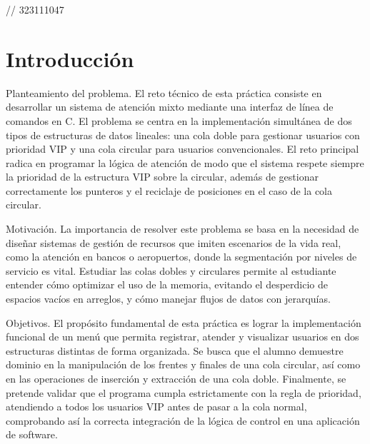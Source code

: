 // 323111047

\section{Introducción}

Planteamiento del problema. El reto técnico de esta práctica consiste en desarrollar un sistema de atención mixto mediante una interfaz de línea de comandos en C. El problema se centra en la implementación simultánea de dos tipos de estructuras de datos lineales: una cola doble para gestionar usuarios con prioridad VIP y una cola circular para usuarios convencionales. El reto principal radica en programar la lógica de atención de modo que el sistema respete siempre la prioridad de la estructura VIP sobre la circular, además de gestionar correctamente los punteros y el reciclaje de posiciones en el caso de la cola circular.

\vspace{0.4cm}

Motivación. La importancia de resolver este problema se basa en la necesidad de diseñar sistemas de gestión de recursos que imiten escenarios de la vida real, como la atención en bancos o aeropuertos, donde la segmentación por niveles de servicio es vital. Estudiar las colas dobles y circulares permite al estudiante entender cómo optimizar el uso de la memoria, evitando el desperdicio de espacios vacíos en arreglos, y cómo manejar flujos de datos con jerarquías.

\vspace{0.4cm}

Objetivos. El propósito fundamental de esta práctica es lograr la implementación funcional de un menú que permita registrar, atender y visualizar usuarios en dos estructuras distintas de forma organizada. Se busca que el alumno demuestre dominio en la manipulación de los frentes y finales de una cola circular, así como en las operaciones de inserción y extracción de una cola doble. Finalmente, se pretende validar que el programa cumpla estrictamente con la regla de prioridad, atendiendo a todos los usuarios VIP antes de pasar a la cola normal, comprobando así la correcta integración de la lógica de control en una aplicación de software.